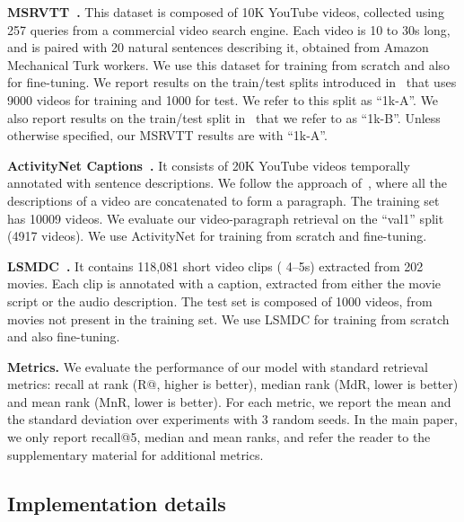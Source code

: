 \documentclass[runningheads]{llncs}
\begin{document}
\noindent\textbf{MSRVTT~\cite{xu2016msrvtt}.} This dataset is composed of 10K YouTube videos, collected using 257 queries from a commercial video search engine. Each video is 10 to 30s long, and is paired with 20 natural sentences describing it, obtained from Amazon Mechanical Turk workers. We use this dataset for training from scratch and also for fine-tuning. We report results on the train/test splits introduced in~\cite{Yu2018JSFusion} that uses 9000 videos for training and 1000 for test. We refer to this split as ``1k-A''. We also report results on the train/test split in~\cite{miech2018learning} that we refer to as ``1k-B''. Unless otherwise specified, our MSRVTT results are with ``1k-A''.

\noindent\textbf{ActivityNet Captions~\cite{krishna2017activitynet}.} It consists of 20K YouTube videos temporally annotated with sentence descriptions. We follow the approach of~\cite{zhang2018HSE}, where all the descriptions of a video are concatenated to form a paragraph. The training set has 10009 videos. We evaluate our video-paragraph retrieval on the ``val1'' split (4917 videos). We use ActivityNet for training from scratch and fine-tuning.

\noindent\textbf{LSMDC~\cite{Rohrbach2015LSMDC}.} It contains 118,081 short video clips ( 4–5s) extracted from 202 movies. Each clip is annotated with a caption, extracted from either the movie script or the audio description. The test set is composed of 1000 videos, from movies not present in the training set. We use LSMDC for training from scratch and also fine-tuning.

\noindent\textbf{Metrics.} We evaluate the performance of our model with standard retrieval metrics: recall at rank  (R@, higher is better), median rank (MdR, lower is better) and mean rank (MnR, lower is better). For each metric, we report the mean and the standard deviation over experiments with 3 random seeds. In the main paper, we only report recall@5, median and mean ranks, and refer the reader to the supplementary material for additional metrics.


\subsection{Implementation details}
\label{section:experts}
\end{document}
